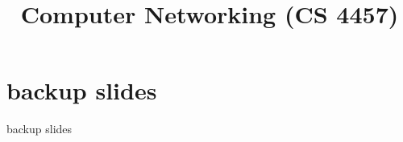 \date{}
\title{Computer Networking (CS 4457)}
\date{}

\begin{frame}
    \titlepage
\end{frame}





\section{backup slides}
\begin{frame}{backup slides}
\end{frame}


